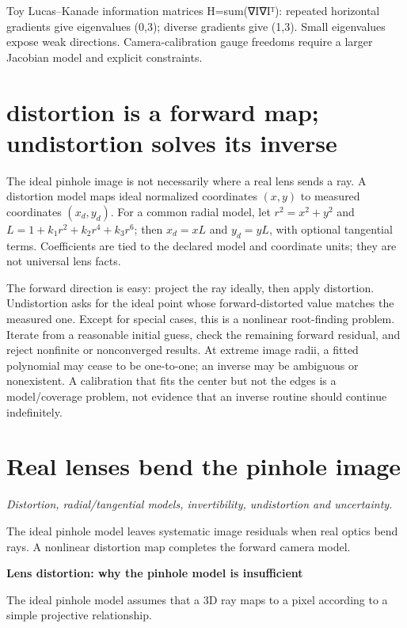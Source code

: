 Toy Lucas--Kanade information matrices H=sum(∇I∇Iᵀ): repeated horizontal gradients give eigenvalues (0,3); diverse gradients give (1,3). Small eigenvalues expose weak directions. Camera-calibration gauge freedoms require a larger Jacobian model and explicit constraints.

\section{distortion is a forward map; undistortion solves its inverse}\label{02-foundations-ii-ch035-distortion-is-a-forward-map-undistortion-solves-its-inverse}

The ideal pinhole image is not necessarily where a real lens sends a ray. A distortion model maps ideal normalized coordinates \((x,y)\) to measured coordinates \((x_d,y_d)\). For a common radial model, let \(r^2=x^2+y^2\) and \(L=1+k_1r^2+k_2r^4+k_3r^6\); then \(x_d=xL\) and \(y_d=yL\), with optional tangential terms. Coefficients are tied to the declared model and coordinate units; they are not universal lens facts.

The forward direction is easy: project the ray ideally, then apply distortion. Undistortion asks for the ideal point whose forward-distorted value matches the measured one. Except for special cases, this is a nonlinear root-finding problem. Iterate from a reasonable initial guess, check the remaining forward residual, and reject nonfinite or nonconverged results. At extreme image radii, a fitted polynomial may cease to be one-to-one; an inverse may be ambiguous or nonexistent. A calibration that fits the center but not the edges is a model/coverage problem, not evidence that an inverse routine should continue indefinitely.

\section{Real lenses bend the pinhole image}\label{02-foundations-ii-ch035-real-lenses-bend-the-pinhole-image}

\emph{Distortion, radial/tangential models, invertibility, undistortion and uncertainty.}

The ideal pinhole model leaves systematic image residuals when real optics bend rays. A nonlinear distortion map completes the forward camera model.

\textbf{Lens distortion: why the pinhole model is insufficient}

The ideal pinhole model assumes that a 3D ray maps to a pixel according to a simple projective relationship.

